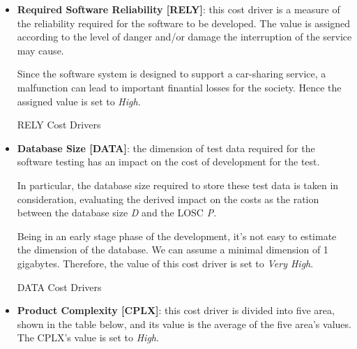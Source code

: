 \begin{itemize}
	\item \textbf{Required Software Reliability [RELY]}: this cost driver is a measure of the reliability required for the software to be developed. The value is assigned according to the level of danger and/or damage the interruption of the service may cause.

Since the software system is designed to support a car-sharing service, a malfunction can lead to important finantial losses for the society. Hence the assigned value is set to \textit{High}.


\begin{costdriverstable}{RELY Cost Drivers}
	\hline
\end{costdriverstable}

	\item \textbf{Database Size [DATA]}: the dimension of test data required for the software testing has an impact on the cost of development for the test. 

In particular, the database size required to store these test data is taken in consideration, evaluating the derived impact on the costs as the ration between the database size \textit{D} and the LOSC \textit{P}.

Being in an early stage phase of the development, it's not easy to estimate the dimension of the database. We can assume a minimal dimension of 1 gigabytes. Therefore, the value of this cost driver is set to \textit{Very High}.

\begin{costdriverstable}{DATA Cost Drivers}
	\hline
\end{costdriverstable}

	\item \textbf{Product Complexity [CPLX]}: this cost driver is divided into five area, shown in the table below, and its value is the average of the five area's values. %
The CPLX's value is set to \textit{High}.


\end{itemize}
